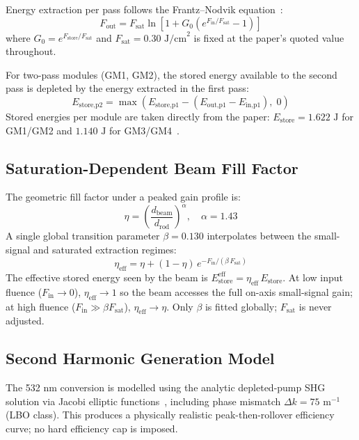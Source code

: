 \documentclass[aps,reprint,twocolumn,amsmath,amssymb,graphicx,nofootinbib]{revtex4-2}
\begin{document}
Energy extraction per pass follows the Frantz--Nodvik equation~\cite{frantz1963theory}:
\begin{equation}
F_{\text{out}} = F_{\text{sat}} \ln\!\left[1 + G_0\!\left(e^{F_{\text{in}}/F_{\text{sat}}} - 1\right)\right]
\end{equation}
where $G_0 = e^{F_{\text{store}}/F_{\text{sat}}}$ and $F_{\text{sat}} = 0.30\text{ J/cm}^2$ is fixed at the paper's quoted value throughout.

For two-pass modules (GM1, GM2), the stored energy available to the second pass is depleted by the energy extracted in the first pass:
\begin{equation}
E_{\text{store,p2}} = \max\!\left(E_{\text{store,p1}} - (E_{\text{out,p1}} - E_{\text{in,p1}}),\; 0\right)
\end{equation}
Stored energies per module are taken directly from the paper: $E_{\text{store}} = 1.622\text{ J}$ for GM1/GM2 and $1.140\text{ J}$ for GM3/GM4~\cite{raza2025all}.

\subsection{Saturation-Dependent Beam Fill Factor}

The geometric fill factor under a peaked gain profile is:
\begin{equation}
\eta = \left(\frac{d_{\text{beam}}}{d_{\text{rod}}}\right)^{\alpha}, \quad \alpha = 1.43
\end{equation}
A single global transition parameter $\beta = 0.130$ interpolates between the small-signal and saturated extraction regimes:
\begin{equation}
\eta_{\text{eff}} = \eta + (1 - \eta)\,e^{-F_{\text{in}}/(\beta\,F_{\text{sat}})}
\end{equation}
The effective stored energy seen by the beam is $E_{\text{store}}^{\text{eff}} = \eta_{\text{eff}}\,E_{\text{store}}$. At low input fluence ($F_{\text{in}} \to 0$), $\eta_{\text{eff}} \to 1$ so the beam accesses the full on-axis small-signal gain; at high fluence ($F_{\text{in}} \gg \beta F_{\text{sat}}$), $\eta_{\text{eff}} \to \eta$. Only $\beta$ is fitted globally; $F_{\text{sat}}$ is never adjusted.

\subsection{Second Harmonic Generation Model}

The 532 nm conversion is modelled using the analytic depleted-pump SHG solution via Jacobi elliptic functions~\cite{boyd2008nonlinear}, including phase mismatch $\Delta k = 75\text{ m}^{-1}$ (LBO class). This produces a physically realistic peak-then-rollover efficiency curve; no hard efficiency cap is imposed.
\end{document}
